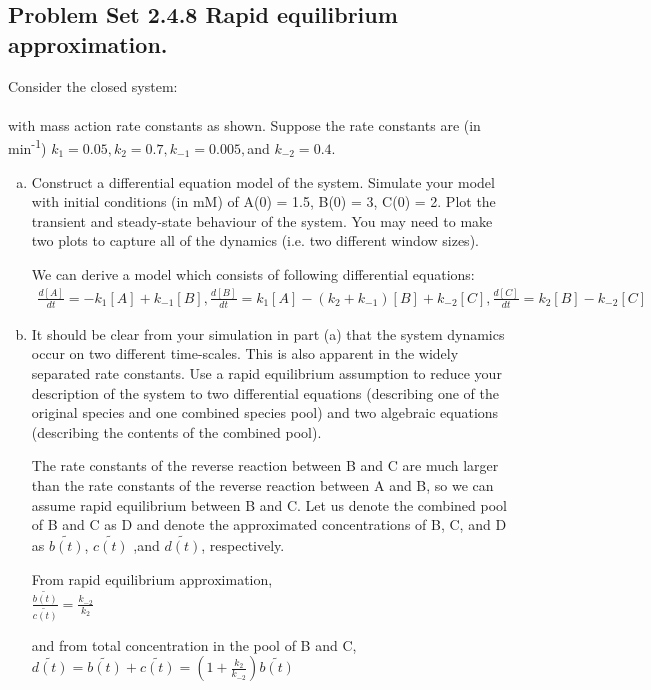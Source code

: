 \documentclass[paper=a4, fontsize=11pt]{scrartcl} %
\numberwithin{equation}{section} %
\numberwithin{figure}{section} %
\numberwithin{table}{section} %
\begin{document}
\subsection{Problem Set 2.4.8 Rapid equilibrium approximation.}
	Consider the closed system:\\
	\\
	with mass action rate constants as shown. Suppose the rate constants are (in min\textsuperscript{-1}) $k_{1} = 0.05, k_{2} = 0.7, k_{-1} = 0.005, $and $ k_{-2} = 0.4$.
	\begin{enumerate}[a)]
		\item Construct a differential equation model of the system. Simulate your model with initial conditions (in mM) of A(0) = 1.5, B(0) = 3, C(0) = 2. Plot the transient and steady-state behaviour of the system. You may need to make two plots to capture all of the dynamics (i.e. two different window sizes).

		We can derive a model which consists of following differential equations:
		\begin{align*}
			\frac{d\left[A\right]}{dt}=-k_{1}\left[A\right]+k_{-1}\left[B\right], \frac{d\left[B\right]}{dt}=k_{1}\left[A\right]-(k_{2}+k_{-1})\left[B\right]+k_{-2}\left[C\right], \frac{d\left[C\right]}{dt}=k_{2}\left[B\right]-k_{-2}\left[C\right]
		\end{align*}

		\item It should be clear from your simulation in part (a) that the system dynamics occur on two different time-scales. This is also apparent in the widely separated rate constants. Use a rapid equilibrium assumption to reduce your description of the system to two differential equations (describing one of the original species and one combined species pool) and two algebraic equations (describing the contents of the combined pool).

		The rate constants of the reverse reaction between B and C are much larger than the rate constants of the reverse reaction between A and B, so we can assume rapid equilibrium between B and C. Let us denote the combined pool of B and C as D and denote the approximated concentrations of B, C, and D as $\tilde{b(t)}$, $\tilde{c(t)}$ ,and $\tilde{d(t)}$, respectively.
		
		From rapid equilibrium approximation, \\
		$\frac{\tilde{b(t)}}{\tilde{c(t)}}=\frac{k_{-2}}{k_2}$
		
		and from total concentration in the pool of B and C,\\
		$\tilde{d(t)}=\tilde{b(t)}+\tilde{c(t)}=(1+\frac{k_2}{k_{-2}})\tilde{b(t)}$


\end{enumerate}
\end{document}
